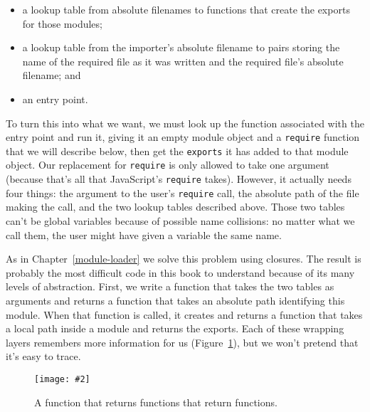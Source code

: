 \documentclass[krantzl]{krantz}
\newcommand{\figpdf}[4]{\begin{figure}%
\centering%
\texttt{[image: \#2]}%
\caption{#3}%
\label{#1}%
\end{figure}}
\newcommand{\chapref}[1]{Chapter~\ref{#1}}
\newcommand{\figref}[1]{Figure~\ref{#1}}
\begin{document}
\begin{itemize}

\item 

a lookup table from absolute filenames
    to functions that create the exports for those modules;



\item 

a lookup table from the importer's absolute filename
    to pairs storing the name of the required file as it was written
    and the required file's absolute filename;
    and



\item 

an entry point.



\end{itemize}


To turn this into what we want,
we must look up the function associated with the entry point and run it,
giving it an empty module object and a \texttt{require} function that we will describe below,
then get the \texttt{exports} it has added to that module object.
Our replacement for \texttt{require} is only allowed to take one argument
(because that's all that JavaScript's \texttt{require} takes).
However,
it actually needs four things:
the argument to the user's \texttt{require} call,
the absolute path of the file making the call,
and the two lookup tables described above.
Those two tables can't be global variables because of possible name collisions:
no matter what we call them,
the user might have given a variable the same name.


As in \chapref{module-loader} we solve this problem using closures.
The result is probably the most difficult code in this book to understand
because of its many levels of abstraction.
First, we write a function that takes the two tables as arguments
and returns a function that takes an absolute path identifying this module.
When that function is called,
it creates and returns a function that takes a local path inside a module and returns the exports.
Each of these wrapping layers remembers more information for us
(\figref{module-bundler-returning-functions}),
but we won't pretend that it's easy to trace.

\figpdf{module-bundler-returning-functions}{./module-bundler/returning-functions.pdf}{A function that returns functions that return functions.}{0.6}
\end{document}
